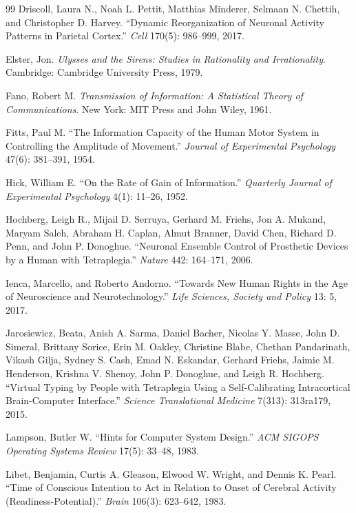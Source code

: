 \documentclass[11pt,twoside,openany]{book}
\theoremstyle{definition}
\theoremstyle{remark}
\begin{document}
\begin{thebibliography}{99}
 Driscoll, Laura N., Noah L. Pettit, Matthias Minderer, Selmaan N. Chettih, and Christopher D. Harvey. ``Dynamic Reorganization of Neuronal Activity Patterns in Parietal Cortex.'' \textit{Cell} 170(5): 986--999, 2017.

 Elster, Jon. \textit{Ulysses and the Sirens: Studies in Rationality and Irrationality}. Cambridge: Cambridge University Press, 1979.

 Fano, Robert M. \textit{Transmission of Information: A Statistical Theory of Communications}. New York: MIT Press and John Wiley, 1961.

 Fitts, Paul M. ``The Information Capacity of the Human Motor System in Controlling the Amplitude of Movement.'' \textit{Journal of Experimental Psychology} 47(6): 381--391, 1954.

 Hick, William E. ``On the Rate of Gain of Information.'' \textit{Quarterly Journal of Experimental Psychology} 4(1): 11--26, 1952.

 Hochberg, Leigh R., Mijail D. Serruya, Gerhard M. Friehs, Jon A. Mukand, Maryam Saleh, Abraham H. Caplan, Almut Branner, David Chen, Richard D. Penn, and John P. Donoghue. ``Neuronal Ensemble Control of Prosthetic Devices by a Human with Tetraplegia.'' \textit{Nature} 442: 164--171, 2006.

 Ienca, Marcello, and Roberto Andorno. ``Towards New Human Rights in the Age of Neuroscience and Neurotechnology.'' \textit{Life Sciences, Society and Policy} 13: 5, 2017.

 Jarosiewicz, Beata, Anish A. Sarma, Daniel Bacher, Nicolas Y. Masse, John D. Simeral, Brittany Sorice, Erin M. Oakley, Christine Blabe, Chethan Pandarinath, Vikash Gilja, Sydney S. Cash, Emad N. Eskandar, Gerhard Friehs, Jaimie M. Henderson, Krishna V. Shenoy, John P. Donoghue, and Leigh R. Hochberg. ``Virtual Typing by People with Tetraplegia Using a Self-Calibrating Intracortical Brain-Computer Interface.'' \textit{Science Translational Medicine} 7(313): 313ra179, 2015.

 Lampson, Butler W. ``Hints for Computer System Design.'' \textit{ACM SIGOPS Operating Systems Review} 17(5): 33--48, 1983.

 Libet, Benjamin, Curtis A. Gleason, Elwood W. Wright, and Dennis K. Pearl. ``Time of Conscious Intention to Act in Relation to Onset of Cerebral Activity (Readiness-Potential).'' \textit{Brain} 106(3): 623--642, 1983.


\end{thebibliography}
\end{document}
